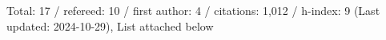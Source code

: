 Total: 17 / refereed: 10 / first author: 4 / citations: 1,012 / h-index: 9 (Last updated: 2024-10-29), List attached below